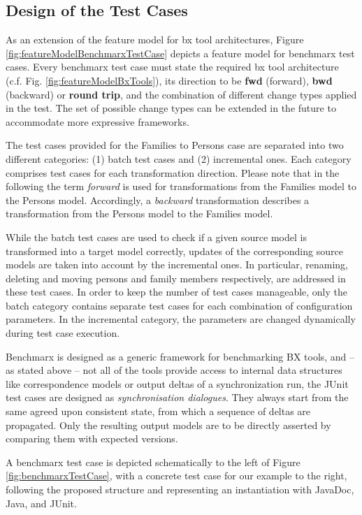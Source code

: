 \subsection{Design of the Test Cases}

As an extension of the feature model for bx tool architectures, Figure \ref{fig:featureModelBenchmarxTestCase} depicts a feature model for benchmarx test cases. Every benchmarx test case must state the required bx tool architecture (c.f. Fig. \ref{fig:featureModelBxTools}), its direction to be \textbf{fwd} (forward), \textbf{bwd} (backward) or \textbf{round trip}, and the combination of different change types applied in the test. The set of possible change types can be extended in the future to accommodate more expressive frameworks. 

The test cases provided for the Families to Persons case are separated into two different categories: (1) batch test cases and (2) incremental ones. Each category comprises test cases for each transformation direction. Please note that in the following the term \emph{forward} is used for transformations from the Families model to the Persons model. Accordingly, a \emph{backward} transformation describes a transformation from the Persons model to the Families model.

While the batch test cases are used to check if a given source model is transformed into a target model correctly, updates of the corresponding source models are taken into account by the incremental ones. In particular, renaming, deleting and moving persons and family members respectively, are addressed in these test cases. In order to keep the number of test cases manageable, only the batch category contains separate test cases for each combination of configuration parameters. In the incremental category, the parameters are changed dynamically during test case execution.

Benchmarx is designed as a generic framework for benchmarking BX tools, and -- as stated above -- not all of the tools provide access to internal data structures like correspondence models or output deltas of a synchronization run, the JUnit test cases are designed as \emph{synchronisation dialogues}. They always start from the same agreed upon consistent state, from which a sequence of deltas are propagated. Only the resulting output models are to be directly asserted by comparing them with expected versions. 

A benchmarx test case is depicted schematically to the left of Figure \ref{fig:benchmarxTestCase}, with a concrete test case for our example to the right, following the proposed structure and representing an instantiation with JavaDoc, Java, and JUnit.

